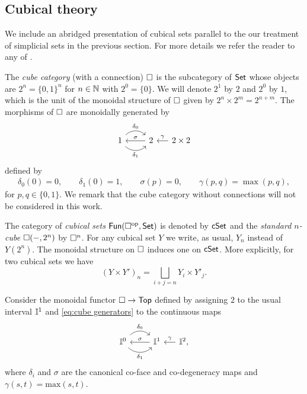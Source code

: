 \subsection{Cubical theory}\label{ss:cubical}

We include an abridged presentation of cubical sets parallel to the our treatment of simplicial sets in the previous section.
For more details we refer the reader to any of \cite{grandis2003cubical, medina2022cube_einfty, medina2023flowing}.

The \textit{cube category} (with a connection) $\square$ is the subcategory of $\mathsf{Set}$ whose objects are $2^n = \{0, 1\}^n$ for $n \in \mathbb{N}$ with $2^0 = \{0\}$.
We will denote $2^1$ by $2$ and $2^0$ by $1$, which is the unit of the monoidal structure of $\square$ given by $2^n \times 2^m = 2^{n+m}$.
The morphisms of $\square$ are monoidally generated by
\begin{equation}\label{eq:cube generators}
	\begin{tikzcd}
		1 \arrow[r, out=45, in=135, "\delta_0"] \arrow[r, out=-45, in=-135, "\delta_1"'] & 2 \arrow[l, "\sigma"'] &[-10pt] \arrow[l, "\gamma"'] 2 \times 2
	\end{tikzcd}
\end{equation}
defined by
\begin{gather*}
	\delta_0(0) = 0, \qquad
	\delta_1(0) = 1, \qquad
	\sigma(p) = 0, \qquad
	\gamma(p,q) = \max(p,q),
\end{gather*}
for $p,q \in \{0,1\}$.
We remark that the cube category without connections will not be considered in this work.

The category of \textit{cubical sets} $\mathsf{Fun}(\square^{\mathrm{op}}, \mathsf{Set})$ is denoted by $\mathsf{cSet}$ and
the \textit{standard $n$-cube} $\square(-, 2^n)$ by $\square^n$.
For any cubical set $Y$ we write, as usual, $Y_n$ instead of $Y(2^n)$.
The monoidal structure on $\square$ induces one on $\mathsf{cSet}$.
More explicitly, for two cubical sets we have
\[
(Y \times Y')_n = \bigsqcup_{i+j=n} Y_i \times Y'_j.
\]

Consider the monoidal functor $\square \to \mathsf{Top}$ defined by assigning $2$ to the usual interval $\mathbb{I}^1$ and \eqref{eq:cube generators} to the continuous maps
\[
\begin{tikzcd}
	\gcube^0 \arrow[r, out=45, in=135, "\delta_0"] \arrow[r, out=-45, in=-135, "\delta_1"'] & \gcube^1 \arrow[l, "\sigma"'] &[-10pt] \arrow[l, "\gamma"'] \gcube^2,
\end{tikzcd}
\]
where $\delta_i$ and $\sigma$ are the canonical co-face and co-degeneracy maps and $\gamma(s,t)=\text{max}(s,t)$.


